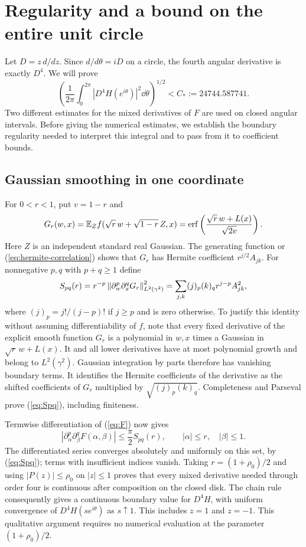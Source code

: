 \section{Regularity and a bound on the entire unit circle}
Let $D=z\,d/dz$. Since $d/d\theta=iD$ on a circle, the fourth
angular derivative is exactly $D^4$. We will prove
\begin{equation}\label{eq:C4}
 \left(\frac1{2\pi}\int_0^{2\pi}|D^4H(e^{i\theta})|^2\dd\theta\right)^{1/2}
 <C_*:=24744.587741.
\end{equation}
Two different estimates for the mixed derivatives of $F$ are used on
closed angular intervals. Before giving the numerical estimates, we
establish the boundary regularity needed to interpret this integral and
to pass from it to coefficient bounds.

\subsection{Gaussian smoothing in one coordinate}
For $0<r<1$, put $v=1-r$ and
\[
 G_r(w,x)=\mathbb E_Z f(\sqrt r\,w+\sqrt{1-r}\,Z,x)
 =\operatorname{erf}\left(\frac{\sqrt r\,w+L(x)}{\sqrt{2v}}\right).
\]
Here $Z$ is an independent standard real Gaussian. The generating
function or (\ref{eq:hermite-correlation}) shows that $G_r$ has Hermite
coefficient $r^{j/2}A_{jk}$. For nonnegative $p,q$ with $p+q\geq1$ define
\begin{equation}\label{eq:Spq}
 S_{pq}(r)=r^{-p}\left\lVert\partial_w^p\partial_x^qG_r\right\rVert_{L^2(\gamma^2)}^2
 =\sum_{j,k}(j)_{p}(k)_{q}r^{j-p}A_{jk}^2,
\end{equation}
where $(j)_p=j!/(j-p)!$ if $j\geq p$ and is zero otherwise.
To justify this identity without assuming differentiability of $f$, note
that every fixed derivative of the explicit smooth function $G_r$ is a
polynomial in $w,x$ times a Gaussian in $\sqrt r\,w+L(x)$. It and all
lower derivatives have at most polynomial growth and belong to
$L^2(\gamma^2)$. Gaussian integration by parts therefore has vanishing
boundary terms. It identifies the Hermite coefficients of the derivative
as the shifted coefficients of $G_r$ multiplied by
$\sqrt{(j)_p(k)_q}$. Completeness and Parseval prove
(\ref{eq:Spq}), including finiteness.

Termwise differentiation of (\ref{eq:F}) now gives
\begin{equation}\label{eq:smoothing-bound}
 |\partial_\alpha^p\partial_\beta^qF(\alpha,\beta)|
 \leq\frac\pi2 S_{pq}(r),\qquad |\alpha|\leq r,\quad |\beta|\leq1.
\end{equation}
The differentiated series converges absolutely and uniformly on this
set, by (\ref{eq:Spq}); terms with insufficient indices vanish. Taking
$r=(1+\rho_0)/2$ and using $|P(z)|\leq\rho_0$ on $|z|\leq1$ proves
that every mixed derivative needed through order four is continuous
after composition on the closed disk. The chain rule consequently gives
a continuous boundary value for $D^4H$, with uniform convergence of
$D^4H(se^{i\theta})$ as $s\uparrow1$. This includes $z=1$ and $z=-1$.
This qualitative argument requires no numerical evaluation at the
parameter $(1+\rho_0)/2$.

